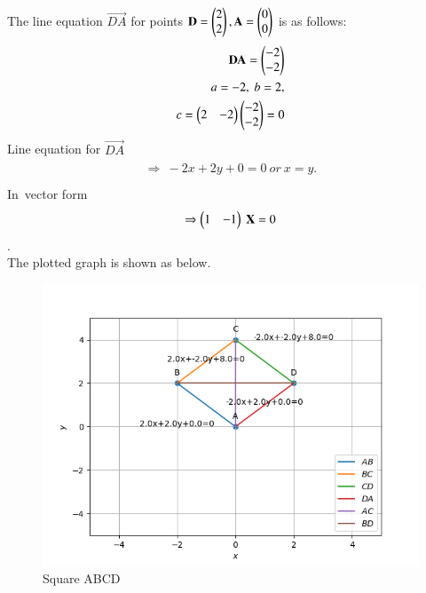 \documentclass[journal,12pt,twocolumn]{IEEEtran}
\begin{document}
The line equation $\vec{DA}$ for points $\mathbf{D} = \begin{pmatrix}2\\2\end{pmatrix}, \mathbf{A} = \begin{pmatrix}0\\0\end{pmatrix}$ is as follows:\\
\begin{align}
\begin{split}
\mathbf{DA} = \begin{pmatrix}-2\\-2\end{pmatrix}\\
a=-2,\ b=2,\\
c=\begin{pmatrix}2 & -2\end{pmatrix} \begin{pmatrix}-2\\-2\end{pmatrix}=0
\end{split}
\end{align}
Line equation for $\vec{DA}$ 
\begin{align}
\begin{split}
\Rightarrow\ -2x+2y+0=0 \ or \ x=y. \\
\end{split}
\end{align}
In\ vector form
\begin{align}
\begin{split}
\Rightarrow \begin{pmatrix}1&-1\end{pmatrix}\ \mathbf{X}=0
\end{split}
\end{align}.
\\
The plotted graph is shown as below.
\begin{figure}[!ht]
    \centering
    \includegraphics[width=\columnwidth]{assignment2_shiftingvertices.png}
    \caption{Square ABCD}
    \label{fig:Square ABCD}
\end{figure}
\end{document}
